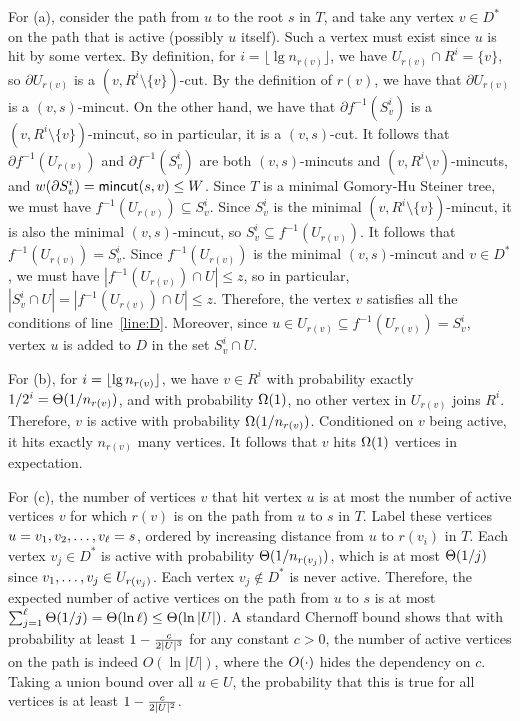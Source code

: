 For (a), consider the path from $u$ to the root $s$ in $T$, and take any vertex $v\in D^*$ on the path that is active (possibly $u$ itself). Such a vertex must exist since $u$ is hit by some vertex. By definition, for $i=\lfloor\lg n_{r(v)}\rfloor$, we have $U_{r(v)}\cap R^i=\{v\}$, so $\partial U_{r(v)}$ is a $(v,R^i\setminus \{v\})$-cut.  By the definition of $r(v)$, we have that $\partial U_{r(v)}$ is a $(v,s)$-mincut. On the other hand, we have that $\partial f^{-1}(S^i_v)$ is a $(v,R^i\setminus\{v\})$-mincut, so in particular, it is a $(v,s)$-cut. It follows that $\partial f^{-1}(U_{r(v)})$ and $\partial f^{-1}(S^i_v)$ are both $(v,s)$-mincuts and $(v,R^i\setminus v)$-mincuts, and $w(\partial S^i_v)=\textsf{\textup{mincut}}(s,v)\le W$. Since $T$ is a minimal Gomory-Hu Steiner tree, we must have $f^{-1}(U_{r(v)}) \subseteq S^i_v$. Since $S^i_v$ is the minimal $(v,R^i\setminus\{v\})$-mincut, it is also the minimal $(v,s)$-mincut, so $S^i_v\subseteq f^{-1}(U_{r(v)}) $. It follows that $f^{-1}(U_{r(v)})=S^i_v$. Since $f^{-1}(U_{r(v)})$ is the minimal $(v,s)$-mincut and $v\in D^*$, we must have $|f^{-1}(U_{r(v)})\cap U|\le z$, so in particular, $|S^i_v\cap U|=|f^{-1}(U_{r(v)})\cap U|\le z$. Therefore, the vertex $v$ satisfies all the conditions of line~\ref{line:D}. Moreover, since $u\in U_{r(v)}\subseteq f^{-1}(U_{r(v)})= S^i_v$, vertex $u$ is added to $D$ in the set $S^i_v\cap U$. 

For (b), for $i=\lfloor\lg n_{r(v)}\rfloor$, we have $v\in R^i$ with probability exactly $1/2^i = \Theta(1/n_{r(v)})$, and with probability $\Omega(1)$, no other vertex in $U_{r(v)}$ joins $R^i$. Therefore, $v$ is active with probability $\Omega(1/n_{r(v)})$. Conditioned on $v$ being active, it hits exactly $n_{r(v)}$ many vertices. It follows that $v$ hits $\Omega(1)$ vertices in expectation.

For (c), the number of vertices $v$ that hit vertex $u$ is at most the number of active vertices $v$ for which $r(v)$ is on the path from $u$ to $s$ in $T$. Label these vertices $u=v_1,v_2,\ldots,v_\ell=s$, ordered by increasing distance from $u$ to $r(v_i)$ in $T$. Each vertex $v_j\in D^*$ is active with probability $\Theta(1/n_{r(v_j)})$, which is at most $\Theta(1/j)$ since $v_1,\ldots,v_j \in U_{r(v_j)}$. Each vertex $v_j\notin D^*$ is never active. Therefore, the expected number of active vertices on the path from $u$ to $s$ is at most $\sum_{j=1}^\ell\Theta(1/j)=\Theta(\ln\ell)\le \Theta(\ln|U|)$. A standard Chernoff bound shows that with probability at least $1-\frac c{2|U|^3}$ for any constant $c>0$, the number of active vertices on the path is indeed $O(\ln|U|)$, where the $O(\cdot)$ hides the dependency on $c$. Taking a union bound over all $u\in U$, the probability that this is true for all vertices is at least $1-\frac c{2|U|^2}$.


